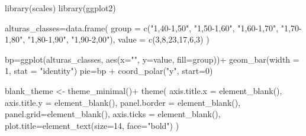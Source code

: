 \documentclass[
]{book}
\newenvironment{Shaded}{\begin{snugshade}}{\end{snugshade}}
\newcommand{\AttributeTok}[1]{\textcolor[rgb]{0.77,0.63,0.00}{#1}}
\newcommand{\DecValTok}[1]{\textcolor[rgb]{0.00,0.00,0.81}{#1}}
\newcommand{\FunctionTok}[1]{\textcolor[rgb]{0.00,0.00,0.00}{#1}}
\newcommand{\NormalTok}[1]{#1}
\newcommand{\OtherTok}[1]{\textcolor[rgb]{0.56,0.35,0.01}{#1}}
\newcommand{\SpecialCharTok}[1]{\textcolor[rgb]{0.00,0.00,0.00}{#1}}
\newcommand{\StringTok}[1]{\textcolor[rgb]{0.31,0.60,0.02}{#1}}
\begin{document}
\begin{Shaded}
\begin{Highlighting}[]
\FunctionTok{library}\NormalTok{(scales)}
\FunctionTok{library}\NormalTok{(ggplot2)}

\NormalTok{alturas\_classes}\OtherTok{=}\FunctionTok{data.frame}\NormalTok{(}
  \AttributeTok{group =} \FunctionTok{c}\NormalTok{(}\StringTok{"1,40{-}1,50"}\NormalTok{,}
            \StringTok{"1,50{-}1,60"}\NormalTok{,}
            \StringTok{"1,60{-}1,70"}\NormalTok{,}
            \StringTok{"1,70{-}1,80"}\NormalTok{,}
            \StringTok{"1,80{-}1,90"}\NormalTok{,}
            \StringTok{"1,90{-}2,00"}\NormalTok{),}
  \AttributeTok{value =} \FunctionTok{c}\NormalTok{(}\DecValTok{3}\NormalTok{,}\DecValTok{8}\NormalTok{,}\DecValTok{23}\NormalTok{,}\DecValTok{17}\NormalTok{,}\DecValTok{6}\NormalTok{,}\DecValTok{3}\NormalTok{)}
\NormalTok{)}

\NormalTok{bp}\OtherTok{=}\FunctionTok{ggplot}\NormalTok{(alturas\_classes, }\FunctionTok{aes}\NormalTok{(}\AttributeTok{x=}\StringTok{""}\NormalTok{, }\AttributeTok{y=}\NormalTok{value, }\AttributeTok{fill=}\NormalTok{group))}\SpecialCharTok{+}
  \FunctionTok{geom\_bar}\NormalTok{(}\AttributeTok{width =} \DecValTok{1}\NormalTok{, }\AttributeTok{stat =} \StringTok{"identity"}\NormalTok{)}
\NormalTok{pie}\OtherTok{=}\NormalTok{bp }\SpecialCharTok{+} \FunctionTok{coord\_polar}\NormalTok{(}\StringTok{"y"}\NormalTok{, }\AttributeTok{start=}\DecValTok{0}\NormalTok{)}

\NormalTok{blank\_theme }\OtherTok{\textless{}{-}} \FunctionTok{theme\_minimal}\NormalTok{()}\SpecialCharTok{+}
  \FunctionTok{theme}\NormalTok{(}
    \AttributeTok{axis.title.x =} \FunctionTok{element\_blank}\NormalTok{(),}
    \AttributeTok{axis.title.y =} \FunctionTok{element\_blank}\NormalTok{(),}
    \AttributeTok{panel.border =} \FunctionTok{element\_blank}\NormalTok{(),}
    \AttributeTok{panel.grid=}\FunctionTok{element\_blank}\NormalTok{(),}
    \AttributeTok{axis.ticks =} \FunctionTok{element\_blank}\NormalTok{(),}
    \AttributeTok{plot.title=}\FunctionTok{element\_text}\NormalTok{(}\AttributeTok{size=}\DecValTok{14}\NormalTok{, }\AttributeTok{face=}\StringTok{"bold"}\NormalTok{)}
\NormalTok{  )}


\end{Highlighting}
\end{Shaded}
\end{document}
